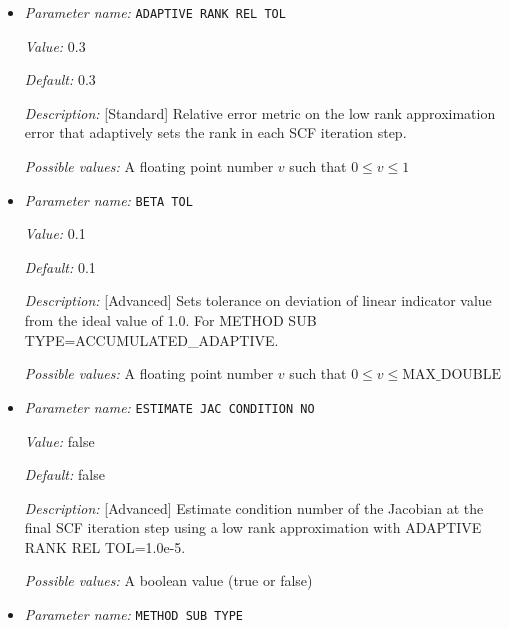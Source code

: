 \begin{itemize}
\item {\it Parameter name:} {\tt ADAPTIVE RANK REL TOL}
\label{parameters:SCF parameters/LOW RANK DIELECM PRECOND/ADAPTIVE RANK REL TOL}
\label{parameters:SCF_20parameters/LOW_20RANK_20DIELECM_20PRECOND/ADAPTIVE_20RANK_20REL_20TOL}


{\it Value:} 0.3


{\it Default:} 0.3


{\it Description:} [Standard] Relative error metric on the low rank approximation error that adaptively sets the rank in each SCF iteration step.


{\it Possible values:} A floating point number $v$ such that $0 \leq v \leq 1$
\item {\it Parameter name:} {\tt BETA TOL}
\label{parameters:SCF parameters/LOW RANK DIELECM PRECOND/BETA TOL}
\label{parameters:SCF_20parameters/LOW_20RANK_20DIELECM_20PRECOND/BETA_20TOL}


{\it Value:} 0.1


{\it Default:} 0.1


{\it Description:} [Advanced] Sets tolerance on deviation of linear indicator value from the ideal value of 1.0. For METHOD SUB TYPE=ACCUMULATED_ADAPTIVE.


{\it Possible values:} A floating point number $v$ such that $0 \leq v \leq \text{MAX\_DOUBLE}$
\item {\it Parameter name:} {\tt ESTIMATE JAC CONDITION NO}
\label{parameters:SCF parameters/LOW RANK DIELECM PRECOND/ESTIMATE JAC CONDITION NO}
\label{parameters:SCF_20parameters/LOW_20RANK_20DIELECM_20PRECOND/ESTIMATE_20JAC_20CONDITION_20NO}


{\it Value:} false


{\it Default:} false


{\it Description:} [Advanced] Estimate condition number of the Jacobian at the final SCF iteration step using a low rank approximation with ADAPTIVE RANK REL TOL=1.0e-5.


{\it Possible values:} A boolean value (true or false)
\item {\it Parameter name:} {\tt METHOD SUB TYPE}
\label{parameters:SCF parameters/LOW RANK DIELECM PRECOND/METHOD SUB TYPE}
\label{parameters:SCF_20parameters/LOW_20RANK_20DIELECM_20PRECOND/METHOD_20SUB_20TYPE}



\end{itemize}
